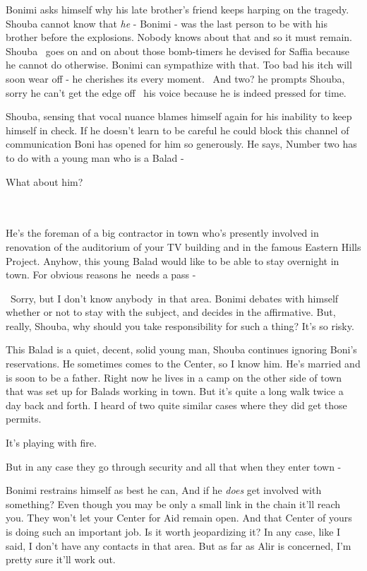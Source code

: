 \documentclass[12pt]{book}
\begin{document}
Bonimi asks himself why his late brother's friend keeps harping on the tragedy. Shouba cannot know that \textit{he} -
Bonimi - was the last person to be with his brother before the explosions. Nobody knows about that and so it must
remain. Shouba~ goes on and on about those bomb-timers he devised for Saffia because he cannot do otherwise. Bonimi can
sympathize with that. Too bad his itch will soon wear off - he cherishes its every moment. ~{\textquotedbl}And
two?{\textquotedbl} he prompts Shouba, sorry he can't get the edge off \ his voice because he is indeed pressed for
time.

Shouba, sensing that vocal nuance blames himself again for his inability to keep himself in check. If he doesn't learn
to be careful he could block this channel of communication Boni has opened for him so generously. He says,
{\textquotedbl}Number two has to do with a young man who is a Balad -{\textquotedbl}

{\textquotedbl}What about him?{\textquotedbl}
~~~~~~~~~~~~~~~~~~~~~~~~~~~~~~~~~~~~~~~~~~~~~~~~~~~~~~~~~~~~~~~~~~~~~~~~~~~~~~

{\textquotedbl}He's the foreman of a big contractor in town who's presently involved in renovation of the auditorium of
your TV building and in the famous Eastern Hills Project. Anyhow, this young Balad would like to be able to stay
overnight in town. For obvious reasons he~needs a pass -{\textquotedbl}

~{\textquotedbl}Sorry, but I don't know anybody~in that area.{\textquotedbl} Bonimi debates with himself whether or not
to stay with the subject, and decides in the affirmative. {\textquotedbl}But, really, Shouba, why should you take
responsibility for such a thing? It's so risky.{\textquotedbl}

{\textquotedbl}This Balad is a quiet, decent, solid young man,{\textquotedbl} Shouba continues ignoring Boni's
reservations. {\textquotedbl}He sometimes comes to the Center, so I know him. He's married and is soon to be a father.
Right now he lives in a camp on the other side of town that was set up for Balads working in town. But it's quite a
long walk twice a day back and forth. I heard of two quite similar cases where they did get those
permits.{\textquotedbl}

{\textquotedbl}It's playing with fire.{\textquotedbl}

{\textquotedbl}But in any case they go through security and all that when they enter town -{\textquotedbl}

Bonimi restrains himself as best he can, {\textquotedbl}And if he \textit{does} get involved with something? Even though
you may be only a small link in the chain it'll reach you. They won't let your Center for Aid remain open. And that
Center of yours is doing such an important job. Is it worth jeopardizing it? In any case, like I said, I don't have any
contacts in that area. But as far as Alir is concerned, I'm pretty sure it'll work out.{\textquotedbl}
\end{document}
